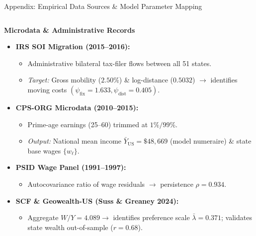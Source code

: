 \documentclass[aspectratio=169, 10pt]{beamer}
\begin{document}
\begin{frame}{Appendix: Empirical Data Sources \& Model Parameter Mapping \hfill \hyperlink{main:calibration}{\scriptsize{}}}\label{backup:data_sources}
    \begin{columns}[T]
        \begin{column}{0.48\textwidth}
            \textbf{\small Microdata \& Administrative Records}
            \vspace{0.04cm}
            \begin{itemize}\scriptsize\setlength{\itemsep}{2pt}
                \item \textbf{IRS SOI Migration (2015--2016):}
                \begin{itemize}\tiny
                    \item Administrative bilateral tax-filer flows between all 51 states.
                    \item \textit{Target:} Gross mobility ($2.50\%$) \& log-distance ($0.5032$) $\to$ identifies moving costs $(\psi_{\text{fix}} = 1.633, \psi_{\text{dist}} = 0.405)$.
                \end{itemize}
                \item \textbf{CPS-ORG Microdata (2010--2015):}
                \begin{itemize}\tiny
                    \item Prime-age earnings (25--60) trimmed at $1\%/99\%$.
                    \item \textit{Output:} National mean income $\bar{Y}_{\text{US}} = \$48,669$ (model numeraire) \& state base wages $\{w_\ell\}$.
                \end{itemize}
                \item \textbf{PSID Wage Panel (1991--1997):}
                \begin{itemize}\tiny
                    \item Autocovariance ratio of wage residuals $\to$ persistence $\rho = 0.934$.
                \end{itemize}
                \item \textbf{SCF \& Geowealth-US (Suss \& Greaney 2024):}
                \begin{itemize}\tiny
                    \item Aggregate $W/Y = 4.089 \to$ identifies preference scale $\bar{\lambda} = 0.371$; validates state wealth out-of-sample ($r=0.68$).
                \end{itemize}
            \end{itemize}
        \end{column}
        

\end{columns}
\end{frame}
\end{document}
